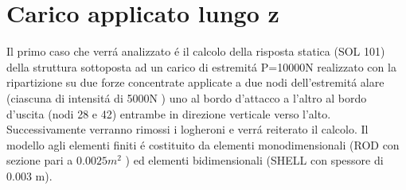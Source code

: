 \documentclass[12pt,a4paper]{article}
\begin{document}
\section{Carico applicato lungo z}
Il primo caso che verr\'a analizzato \'e il calcolo della risposta statica (SOL 101) della struttura sottoposta ad un carico di estremit\'a P=10000N realizzato con la ripartizione
su due forze concentrate applicate a due nodi dell'estremit\'a alare (ciascuna di intensit\'a di 5000N ) uno al
bordo d'attacco a l'altro al bordo d'uscita (nodi 28 e 42) entrambe in direzione verticale verso l'alto. Successivamente verranno rimossi i logheroni e verr\'a reiterato il calcolo.
Il modello agli elementi finiti \'e costituito da elementi monodimensionali (ROD con sezione pari a $ 0.0025 m^2 $ )
ed elementi bidimensionali (SHELL con spessore di 0.003 m).
\end{document}
